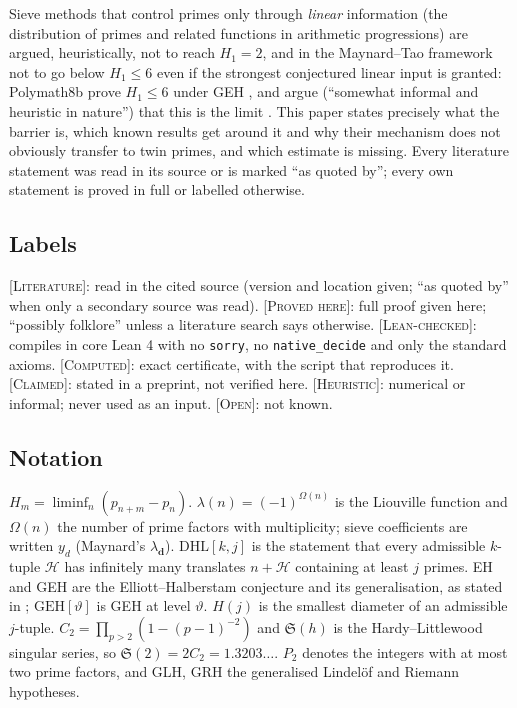 \documentclass[11pt]{amsart}
\theoremstyle{definition}
\theoremstyle{remark}
\newcommand{\lbl}[1]{\textup{\textsc{[#1]}}}
\begin{document}
Sieve methods that control primes only through \emph{linear} information
(the distribution of primes and related functions in arithmetic
progressions) are argued, heuristically, not to reach $H_1=2$, and in the
Maynard--Tao framework not to go below $H_1\le6$ even if the strongest conjectured linear input is
granted: Polymath8b prove $H_1\le6$ under GEH \cite[Theorem~1.4(xii),
p.~3]{PM8b}, and argue (``somewhat informal and heuristic in nature'') that
this is the limit \cite[\S8]{PM8b}. This paper states precisely what the
barrier is, which known results get around it and why their mechanism does
not obviously transfer to twin primes, and which estimate is missing. Every
literature statement was read in its source or is marked ``as quoted by'';
every own statement is proved in full or labelled otherwise.

\subsection*{Labels}
\lbl{Literature}: read in the cited source (version and location given;
``as quoted by'' when only a secondary source was read).
\lbl{Proved here}: full proof given here; ``possibly folklore'' unless a
literature search says otherwise. \lbl{Lean-checked}: compiles in core Lean 4
with no \texttt{sorry}, no \texttt{native\_decide} and only the standard axioms.
\lbl{Computed}: exact certificate, with the script that reproduces it.
\lbl{Claimed}: stated in a preprint, not verified here. \lbl{Heuristic}:
numerical or informal; never used as an input. \lbl{Open}: not known.

\subsection*{Notation}
$H_m=\liminf_n(p_{n+m}-p_n)$. $\lambda(n)=(-1)^{\Omega(n)}$ is the Liouville function and $\Omega(n)$ the
number of prime factors with multiplicity; sieve coefficients are written
$y_d$ (Maynard's $\lambda_{\mathbf d}$). $\mathrm{DHL}[k,j]$ is the statement
that every admissible $k$-tuple $\mathcal H$ has infinitely many translates
$n+\mathcal H$ containing at least $j$ primes. EH and GEH are the
Elliott--Halberstam conjecture and its generalisation, as stated in \cite[Claims~2.2, 2.6]{PM8b};
$\mathrm{GEH}[\vartheta]$ is GEH at level $\vartheta$. $H(j)$ is the smallest
diameter of an admissible $j$-tuple. $C_2=\prod_{p>2}(1-(p-1)^{-2})$ and
$\mathfrak S(h)$ is the Hardy--Littlewood singular series, so
$\mathfrak S(2)=2C_2=1.3203\ldots$. $P_2$ denotes the integers with at most two
prime factors, and GLH, GRH the generalised Lindel\"of and Riemann hypotheses.
\end{document}
